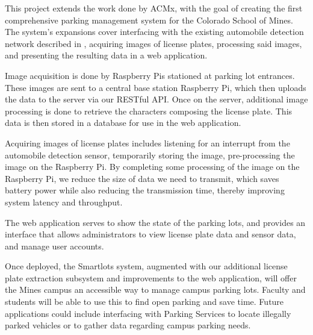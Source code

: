 \documentclass[11pt, oneside, fullpage, doublespace]{article}
\begin{document}
This project extends the work done by ACMx, with the goal of creating the first comprehensive parking management system for the Colorado School of Mines. The system's expansions cover interfacing with the existing automobile detection network described in \cite{stillwell2013}, acquiring images of license plates, processing said images, and presenting the resulting data in a web application.

Image acquisition is done by Raspberry Pis stationed at parking lot entrances. These images are sent to a central base station Raspberry Pi, which then uploads the data to the server via our RESTful API. Once on the server, additional image processing is done to retrieve the characters composing the license plate. This data is then stored in a database for use in the web application.

Acquiring images of license plates includes listening for an interrupt from the automobile detection sensor, temporarily storing the image, pre-processing the image on the Raspberry Pi. By completing some processing of the image on the Raspberry Pi, we reduce the size of data we need to transmit, which saves battery power while also reducing the transmission time, thereby improving system latency and throughput.

The web application serves to show the state of the parking lots, and provides an interface that allows administrators to view license plate data and sensor data, and manage user accounts.

Once deployed, the Smartlots system, augmented with our additional license plate extraction subsystem and improvements to the web application, will offer the Mines campus an accessible way to manage campus parking lots. Faculty and students will be able to use this to find open parking and save time. Future applications could include interfacing with Parking Services to locate illegally parked vehicles or to gather data regarding campus parking needs.
\end{document}
